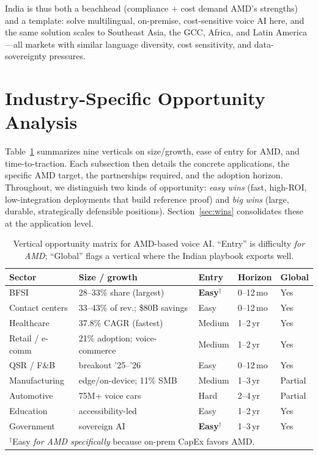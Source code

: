 \documentclass[blind]{gtac}
\begin{document}
India is thus both a beachhead (compliance + cost demand AMD's strengths) and a template: solve multilingual, on-premise, cost-sensitive voice AI here, and the same solution scales to Southeast Asia, the GCC, Africa, and Latin America---all markets with similar language diversity, cost sensitivity, and data-sovereignty pressures.

\section{Industry-Specific Opportunity Analysis}
\label{sec:sectors}

Table~\ref{tab:sectors} summarizes nine verticals on size/growth, ease of entry for AMD, and time-to-traction. Each subsection then details the concrete applications, the specific AMD target, the partnerships required, and the adoption horizon. Throughout, we distinguish two kinds of opportunity: \emph{easy wins} (fast, high-ROI, low-integration deployments that build reference proof) and \emph{big wins} (large, durable, strategically defensible positions). Section~\ref{sec:wins} consolidates these at the application level.

\begin{table}[H]
\centering
\caption{Vertical opportunity matrix for AMD-based voice AI. ``Entry'' is difficulty \emph{for AMD}; ``Global'' flags a vertical where the Indian playbook exports well.}
\label{tab:sectors}
\tiny
\begin{tabular}{@{}p{0.68in}p{0.86in}p{0.4in}p{0.42in}p{0.3in}@{}}
\toprule
Sector & Size / growth & Entry & Horizon & Global \\
\midrule
BFSI & 28--33\% share (largest) & \textbf{Easy}$^{\dagger}$ & 0--12\,mo & Yes \\
Contact centers & 33--43\% of rev.; \$80B savings & Easy & 0--12\,mo & Yes \\
Healthcare & 37.8\% CAGR (fastest) & Medium & 1--2\,yr & Yes \\
Retail / e-comm & 21\% adoption; voice-commerce & Medium & 1--2\,yr & Yes \\
QSR / F\&B & breakout '25--'26 & Easy & 0--12\,mo & Yes \\
Manufacturing & edge/on-device; 11\% SMB & Medium & 1--3\,yr & Partial \\
Automotive & 75M+ voice cars & Hard & 2--4\,yr & Partial \\
Education & accessibility-led & Easy & 1--2\,yr & Yes \\
Government & sovereign AI & \textbf{Easy}$^{\dagger}$ & 1--3\,yr & Yes \\
\bottomrule
\multicolumn{5}{l}{$^{\dagger}$Easy \emph{for AMD specifically} because on-prem CapEx favors AMD.}
\end{tabular}
\end{table}
\end{document}
